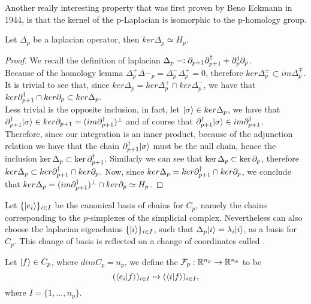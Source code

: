 \documentclass[../1.tex]{subfiles}
\begin{document}
    Another really interesting property that was first proven by Beno Eckmann in 1944, is that the kernel of the p-Laplacian
    is isomorphic to the p-homology group.

    \begin{thm}
        Let $\Delta_p$ be a laplacian operator, then $ker\Delta_p \simeq H_p$.
    \end{thm}
    \begin{proof}
        We recall the definition of laplacian $\Delta_p =: \partial_{p+1}\partial^\dagger_{p+1} + \partial^\dagger_p\partial_p$.\\
        Because of the homology lemma $\Delta^+_p\Delta-_p = \Delta^-_p\Delta^+_p = 0$, therefore $ker\Delta^{\pm}_p \subset im\Delta^{\mp}_p.$\\
        It is trivial to see that, since $ker\Delta_p = ker\Delta^+_p \cap ker\Delta^-_p $, we have that $ker\partial^\dagger_{p+1} \cap ker\partial_p \subset ker\Delta_p.$ \\
        Less trivial is the opposite inclusion, in fact, let $| \sigma \rangle \in ker\Delta_p$, we have that $\partial_{p+1}^\dagger| \sigma \rangle \in ker\partial_{p+1} = (im\partial_{p+1}^\dagger)^\perp$ 
        and of course that $\partial_{p+1}^\dagger| \sigma \rangle \in im\partial_{p+1}^\dagger$.\\
        Therefore, since our integration is an inner product, because of the adjunction relation we have that the chain $\partial_{p+1}^\dagger| \sigma \rangle$ must
        be the null chain, hence the inclusion $\ker\Delta_p \subset \ker\partial_{p+1}^\dagger$. Similarly we can see that $\ker\Delta_p \subset \ker\partial_p$,        
        therefore $ker\Delta_p \subset ker\partial^\dagger_{p+1} \cap ker\partial_p $. Now, since $ker\Delta_p = ker\partial^\dagger_{p+1} \cap ker\partial_p$, we conclude that 
        $ker\Delta_p = (im\partial_{p+1}^\dagger)^\perp \cap ker\partial_p \simeq H_p$. \qedhere
    \end{proof}

    Let $\{| e_i \rangle\}_{i \in I}$ be the canonical basis of chains for $C_p$, namely the chains corresponding to the $p$-simplexes of the simplicial complex.
    Nevertheless can also choose the laplacian eigenchains $\{| i \rangle\}_{i \in I}$, such that $\Delta_p| i \rangle = \lambda_i| i \rangle$, as a basis for $C_p$. This change of basis
    is reflected on a change of coordinates called .

    \begin{defn}
        Let $| f \rangle \in C_p$, where $dimC_p = n_p$, we define the  $\mathcal{F}_p : \mathbb{R}^{n_p} \to \mathbb{R}^{n_p}$ to be
        \[ (\langle e_i | f \rangle)_{i \in I} \mapsto (\langle i | f \rangle)_{i \in I},\]
        where $I = \{1,...,n_p\}$.
    \end{defn}
\end{document}
